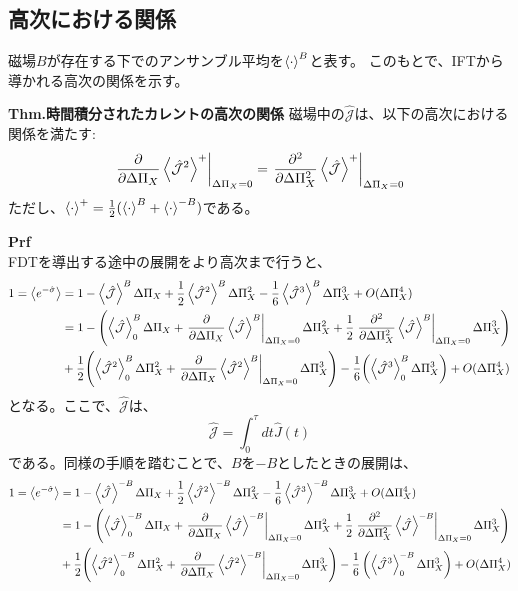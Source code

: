 \documentclass[a4paper,11pt]{jsarticle}
\begin{document}
\subsection{高次における関係}
磁場$B$が存在する下でのアンサンブル平均を$\ev{\cdot}^B$と表す。
このもとで、IFTから導かれる高次の関係を示す。
\begin{itembox}[l]{\textbf{Thm.時間積分されたカレントの高次の関係}}
    磁場中の$\hat{\mathcal{J}}$は、以下の高次における関係を満たす:
    \begin{align}
        \left.\pdv{\Delta \Pi_X} \ev{\hat{\mathcal{J}}^2}^+\right|_{\Delta \Pi_X = 0} = \left.\pdv[2]{\Delta \Pi_X} \ev{\hat{\mathcal{J}}}^+\right|_{\Delta \Pi_X = 0}
    \end{align}
    ただし、$\ev{\cdot}^+ = \frac{1}{2}(\ev{\cdot}^B + \ev{\cdot}^{-B})$である。
\end{itembox}
\textbf{Prf}\\
FDTを導出する途中の展開をより高次まで行うと、
\begin{align}
    1=\ev{e^{-\hat{\sigma}}}&= 1-\ev{\hat{\mathcal{J}}}^B \Delta \Pi_X + \frac{1}{2}\ev{\hat{\mathcal{J}}^2}^B \Delta \Pi_X ^2- \frac{1}{6}\ev{\hat{\mathcal{J}}^3}^B \Delta \Pi_X ^3 + O(\Delta \Pi_X ^4)\\
    &=1-\qty(\ev{\hat{\mathcal{J}}}^B_0 \Delta \Pi_X + \left.\pdv{\Delta \Pi_X} \ev{\hat{\mathcal{J}}}^B \right|_{\Delta \Pi_X = 0} \Delta \Pi_X ^2 + \frac{1}{2}\left.\pdv[2]{\Delta \Pi_X} \ev{\hat{\mathcal{J}}}^B \right|_{\Delta \Pi_X = 0} \Delta \Pi_X ^3 )\\
    &+ \frac{1}{2}\qty(\ev{\hat{\mathcal{J}}^2}^B_0 \Delta \Pi_X ^2 + \left.\pdv{\Delta \Pi_X} \ev{\hat{\mathcal{J}}^2}^B\right|_{\Delta \Pi_X = 0} \Delta \Pi_X ^3)- \frac{1}{6}\qty(\ev{\hat{\mathcal{J}}^3}^B_0 \Delta \Pi_X ^3) + O(\Delta \Pi_X ^4)
\end{align}
となる。ここで、$\hat{\mathcal{J}}$は、
\begin{equation}
    \hat{\mathcal{J}} = \int_{0}^{\tau} dt \hat{J}(t)
\end{equation}
である。同様の手順を踏むことで、$B$を$-B$としたときの展開は、
\begin{align}
    1=\ev{e^{-\hat{\sigma}}}&= 1-\ev{\hat{\mathcal{J}}}^{-B} \Delta \Pi_X + \frac{1}{2}\ev{\hat{\mathcal{J}}^2}^{-B} \Delta \Pi_X ^2- \frac{1}{6}\ev{\hat{\mathcal{J}}^3}^{-B} \Delta \Pi_X ^3 + O(\Delta \Pi_X ^4)\\
    &=1-\left(\ev{\hat{\mathcal{J}}}^{-B}_0 \Delta \Pi_X + \left.\pdv{\Delta \Pi_X} \ev{\hat{\mathcal{J}}}^{-B}\right|_{\Delta \Pi_X = 0} \Delta \Pi_X ^2 + \frac{1}{2}\left.\pdv[2]{\Delta \Pi_X} \ev{\hat{\mathcal{J}}}^{-B}\right|_{\Delta \Pi_X = 0} \Delta \Pi_X ^3 \right)\\
    &+ \frac{1}{2}\qty(\ev{\hat{\mathcal{J}}^2}^{-B}_0 \Delta \Pi_X ^2 + \left.\pdv{\Delta \Pi_X} \ev{\hat{\mathcal{J}}^2}^{-B}\right|_{\Delta \Pi_X = 0} \Delta \Pi_X ^3)- \frac{1}{6}\left(\ev{\hat{\mathcal{J}}^3}^{-B}_0 \Delta \Pi_X ^3\right) + O(\Delta \Pi_X ^4)
\end{align}
\end{document}
